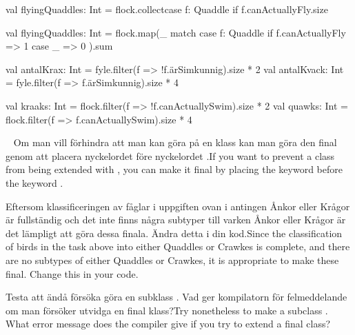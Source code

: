 \begin{Code}
val flyingQuaddles: Int =
  flock.collect{case f: Quaddle if f.canActuallyFly}.size
\end{Code}

\begin{Code}
val flyingQuaddles: Int = flock.map(_ match
  case f: Quaddle if f.canActuallyFly => 1
  case _ => 0
).sum
\end{Code}
\fi

\SubtaskSolved
\ifswedish
\begin{Code}
val antalKrax: Int = fyle.filter(f => !f.ärSimkunnig).size * 2
val antalKvack: Int = fyle.filter(f => f.ärSimkunnig).size * 4
\end{Code}
\else
\begin{Code}
val kraaks: Int = flock.filter(f => !f.canActuallySwim).size * 2
val quawks: Int = flock.filter(f => f.canActuallySwim).size * 4
\end{Code}
\fi


\QUESTEND












\QUESTBEGIN

\Task  \what~  \ifswedish Om man vill förhindra att man kan göra  på en klass kan man göra den final genom att placera nyckelordet  före nyckelordet .\else If you want to prevent a class from being extended with , you can make it final by placing the keyword  before the keyword .\fi

\Subtask \ifswedish Eftersom klassificeringen av fåglar i uppgiften ovan i antingen Ånkor eller Krågor är fullständig och det inte finns några subtyper till varken Ånkor eller Krågor är det lämpligt att göra dessa finala. Ändra detta i din kod.\else Since the classification of birds in the task above into either Quaddles or Crawkes is complete, and there are no subtypes of either Quaddles or Crawkes, it is appropriate to make these final. Change this in your code.\fi

\Subtask \ifswedish Testa att ändå försöka göra en subklass . Vad ger kompilatorn för felmeddelande om man försöker utvidga en final klass?\else Try nonetheless to make a subclass . What error message does the compiler give if you try to extend a final class?\fi


